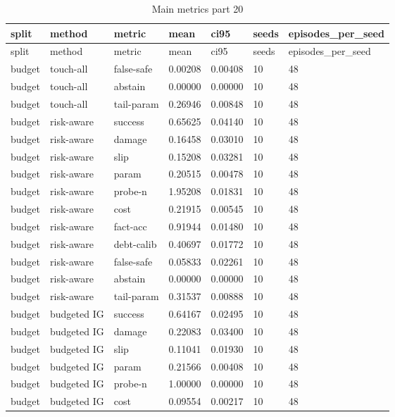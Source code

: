 \documentclass{article}
\begin{document}
\begin{center}
\tiny
\renewcommand{\arraystretch}{0.92}
\setlength{\tabcolsep}{3pt}
\begin{longtable}{lllllll}
\caption{Main metrics part 20}\label{tab:main-metrics-20}\\
\toprule
split & method & metric & mean & ci95 & seeds & episodes\_per\_seed \\
\midrule
\endfirsthead
\toprule
split & method & metric & mean & ci95 & seeds & episodes\_per\_seed \\
\midrule
\endhead
budget & touch-all & false-safe & 0.00208 & 0.00408 & 10 & 48 \\
budget & touch-all & abstain & 0.00000 & 0.00000 & 10 & 48 \\
budget & touch-all & tail-param & 0.26946 & 0.00848 & 10 & 48 \\
budget & risk-aware & success & 0.65625 & 0.04140 & 10 & 48 \\
budget & risk-aware & damage & 0.16458 & 0.03010 & 10 & 48 \\
budget & risk-aware & slip & 0.15208 & 0.03281 & 10 & 48 \\
budget & risk-aware & param & 0.20515 & 0.00478 & 10 & 48 \\
budget & risk-aware & probe-n & 1.95208 & 0.01831 & 10 & 48 \\
budget & risk-aware & cost & 0.21915 & 0.00545 & 10 & 48 \\
budget & risk-aware & fact-acc & 0.91944 & 0.01480 & 10 & 48 \\
budget & risk-aware & debt-calib & 0.40697 & 0.01772 & 10 & 48 \\
budget & risk-aware & false-safe & 0.05833 & 0.02261 & 10 & 48 \\
budget & risk-aware & abstain & 0.00000 & 0.00000 & 10 & 48 \\
budget & risk-aware & tail-param & 0.31537 & 0.00888 & 10 & 48 \\
budget & budgeted IG & success & 0.64167 & 0.02495 & 10 & 48 \\
budget & budgeted IG & damage & 0.22083 & 0.03400 & 10 & 48 \\
budget & budgeted IG & slip & 0.11041 & 0.01930 & 10 & 48 \\
budget & budgeted IG & param & 0.21566 & 0.00408 & 10 & 48 \\
budget & budgeted IG & probe-n & 1.00000 & 0.00000 & 10 & 48 \\
budget & budgeted IG & cost & 0.09554 & 0.00217 & 10 & 48 \\

\end{longtable}
\end{center}
\end{document}
